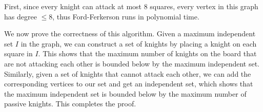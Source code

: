 \documentclass[12pt]{article}
\theoremstyle{definitionstyle}
\begin{document}
    First, since every knight can attack at most 8 squares, every vertex in this graph has degree $\leq 8$, thus Ford-Ferkerson runs in polynomial time. 

    We now prove the correctness of this algorithm. Given a maximum independent set $I$ in the graph, we can construct a set of knights by placing a knight on each square in $I$. This shows that the maximum number of knights on the board that are not attacking each other is bounded below by the maximum independent set. Similarly, given a set of knights that cannot attack each other, we can add the corresponding vertices to our set and get an independent set, which shows that the maximum independent set is bounded below by the maximum number of passive knights. This completes the proof.
\end{document}
